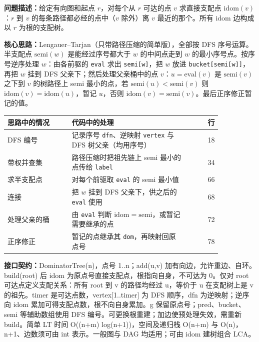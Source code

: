 \noindent\textbf{问题描述：}\allowbreak 给定有向图和起点 $r$，对每个从 $r$ 可达的点 $v$ 求直接支配点 $\mathrm{idom}(v)$：$r$ 到 $v$ 的每条路径都必经的点中（$v$ 除外）离 $v$ 最近的那个。所有 $\mathrm{idom}$ 边构成以 $r$ 为根的支配树。

\textbf{核心思路：}\allowbreak Lengauer–Tarjan（只带路径压缩的简单版），全部按 DFS 序号运算。半支配点 $\mathrm{semi}(w)$ 是能经过序号都大于 $w$ 的中间点走到 $w$ 的最小序号点。按序号逆序处理 $w$：由各前驱的 \texttt{eval} 求出 \texttt{semi[w]}，把 $w$ 放进 \texttt{bucket[semi[w]]}，再把 $w$ 挂到 DFS 父亲下；然后处理父亲桶中的点 $v$：$u=\mathrm{eval}(v)$ 是 $\mathrm{semi}(v)$ 之下到 $v$ 的树路径上 semi 最小的点，若 $\mathrm{semi}(u)<\mathrm{semi}(v)$ 则 $\mathrm{idom}(v)=\mathrm{idom}(u)$，暂记 $u$，否则 $\mathrm{idom}(v)=\mathrm{semi}(v)$。最后正序修正暂记的值。

\begin{center}\small
\begin{tabular}{@{}p{0.30\linewidth}p{0.55\linewidth}r@{}}
\toprule
思路中的情况 & 代码中的处理 & 行\\
\midrule
DFS 编号 & 记录序号 \texttt{dfn}、逆映射 \texttt{vertex} 与 DFS 树父亲（均用序号） & 18\\
带权并查集 & 路径压缩时把祖先链上 semi 最小的点传给 \texttt{label} & 34\\
求半支配点 & 对每个前驱取 \texttt{eval} 的 semi 最小值 & 66\\
连接 & 把 $w$ 挂到 DFS 父亲下，供之后的 \texttt{eval} 使用 & 68\\
处理父亲的桶 & 由 \texttt{eval} 判断 $\mathrm{idom}=\mathrm{semi}$，或暂记需要继承的点 & 72\\
正序修正 & 暂记的点继承其 \texttt{dom}，再映射回原点号 & 78\\
\bottomrule
\end{tabular}
\end{center}



{\sloppy{}\noindent\textbf{接口契约：}DominatorTree(n)，点号 1..n；add(u,v) 加有向边，允许重边、自环。build(root) 后 idom 为原点号直接支配点，根指向自身，不可达为 0。仅对 root 可达点定义支配关系：所有 root 到 v 的路径均经过 u，等价于 u 在支配树上是 v 的祖先。timer 是可达点数，vertex[1..timer] 为 DFS 顺序，dfn 为逆映射；逆序向 idom 累加可得支配点数，根不向自身累加。g 保留原点号；pred、bucket、semi 等辅助数组使用 DFS 编号。可更换根重建；加边使预处理失效，需重新 build。简单 LT 时间 O((n+m) log(n+1))，空间及递归栈 O(n+m) 与 O(n)，n+1、边数须可由 int 表示。一般图与 DAG 均适用；可由 idom 建树组合 LCA。\par}

